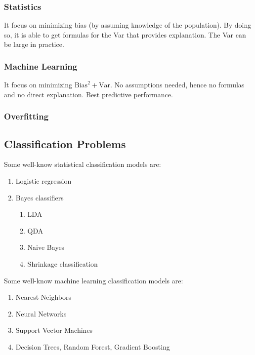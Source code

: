 \subsubsection{Statistics}
It focus on minimizing bias (by assuming knowledge of the population). By doing
so, it is able to get formulas for the Var that provides explanation. The Var can be large in practice.

\subsubsection{Machine Learning}
It focus on minimizing $\text{Bias}^2 + \text{Var}$. No assumptions needed,
hence no formulas and no direct explanation. Best predictive performance.


\subsubsection{Overfitting}

\subsection{Classification Problems}

Some well-know statistical classification models are:
\begin{enumerate}
    \item Logistic regression
    \item Bayes classifiers
    \begin{enumerate}
        \item LDA
        \item QDA
        \item Naive Bayes
        \item Shrinkage classification
    \end{enumerate}
\end{enumerate}

Some well-know machine learning classification models are:
\begin{enumerate}
    \item Nearest Neighbors
    \item Neural Networks
    \item Support Vector Machines
    \item Decision Trees, Random Forest, Gradient Boosting
\end{enumerate}

